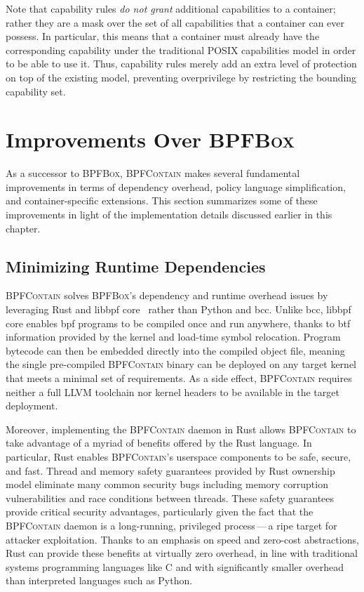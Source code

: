 \documentclass[
  fontsize=12pt,
  titlepage=firstiscover,
  paper=letter,
oneside,
  cleardoublepage=plain,
  parskip=half-,
  DIV=10,
  parindent,
  appendixprefix,
  chapterprefix,
  listof=totoc,
]{scrbook}
\newcommand{\bpfbox}{\textsc{BPFBox}}
\newcommand{\bpfcontain}{\textsc{BPFContain}}
\begin{document}
Note that capability rules \textit{do not grant} additional capabilities to a container;
rather they are a mask over the set of all capabilities that a container can ever possess.
In particular, this means that a container must already have the corresponding capability
under the traditional POSIX capabilities model in order to be able to use it. Thus,
capability rules merely add an extra level of protection on top of the existing model,
preventing overprivilege by restricting the bounding capability set.


\section{Improvements Over \bpfbox{}}\label{s:bpfcontain-improvements}

As a successor to \bpfbox{}, \bpfcontain{} makes several fundamental improvements in terms
of dependency overhead, policy language simplification, and container-specific extensions.
This section summarizes some of these improvements in light of the implementation details
discussed earlier in this chapter.

\subsection{Minimizing Runtime Dependencies}\label{ss:bpfcontain-minimizing}

\bpfcontain{} solves \bpfbox{}'s dependency and runtime overhead issues by leveraging Rust
and libbpf \gls{core}~\cite{nakryiko2020_core} rather than Python and bcc.  Unlike bcc,
libbpf \gls{core} enables \gls{bpf} programs to be compiled once and run anywhere, thanks
to \gls{btf} information provided by the kernel and load-time symbol relocation. Program
bytecode can then be embedded directly into the compiled object file, meaning the single
pre-compiled \bpfcontain{} binary can be deployed on any target kernel that meets
a minimal set of requirements. As a side effect, \bpfcontain{} requires neither a full
LLVM toolchain nor kernel headers to be available in the target deployment.

Moreover, implementing the \bpfcontain{} daemon in Rust allows \bpfcontain{} to take
advantage of a myriad of benefits offered by the Rust language. In particular, Rust
enables \bpfcontain{}'s userspace components to be safe, secure, and fast. Thread and
memory safety guarantees provided by Rust ownership model eliminate many common security
bugs including memory corruption vulnerabilities and race conditions between threads.
These safety guarantees provide critical security advantages, particularly given the fact
that the \bpfcontain{} daemon is a long-running, privileged process\,---\,a ripe target
for attacker exploitation. Thanks to an emphasis on speed and zero-cost abstractions, Rust
can provide these benefits at virtually zero overhead, in line with traditional systems
programming languages like C and with significantly smaller overhead than interpreted
languages such as Python.
\end{document}

